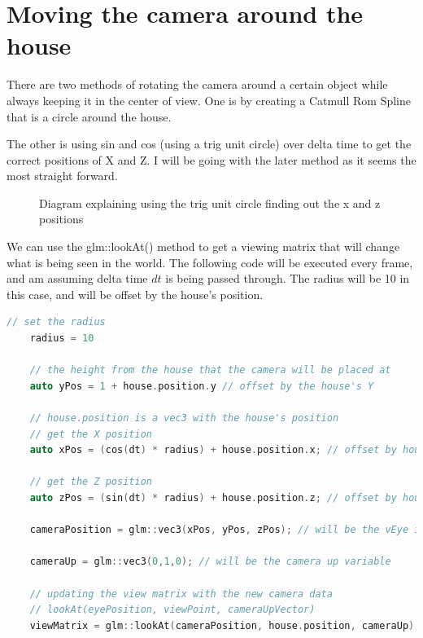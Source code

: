 \documentclass[10pt]{report}
\begin{document}
\section{Moving the camera around the house}
There are two methods of rotating the camera around a certain object while always keeping it in the center of view.
One is by creating a Catmull Rom Spline that is a circle around the house.

The other is using sin and cos (using a trig unit circle) over delta time to get the correct positions of X and Z. I will be going with the later method as it seems the most straight forward.

\begin{figure}[H]
    \centering
    \caption{Diagram explaining using the trig unit circle finding out the x and z positions}
\end{figure}


We can use the glm::lookAt() method to get a viewing matrix that will change what is being seen in the world. The following code will be executed every frame, and am assuming delta time \(dt\) is being passed through. The radius will be 10 in this case, and will be offset by the house's position.

\begin{lstlisting}[language = c]
    // set the radius
    radius = 10

    // the height from the house that the camera will be placed at
    auto yPos = 1 + house.position.y // offset by the house's Y

    // house.position is a vec3 with the house's position
    // get the X position 
    auto xPos = (cos(dt) * radius) + house.position.x; // offset by house's X

    // get the Z position
    auto zPos = (sin(dt) * radius) + house.position.z; // offset by house's Z

    cameraPosition = glm::vec3(xPos, yPos, zPos); // will be the vEye in the lookAt

    cameraUp = glm::vec3(0,1,0); // will be the camera up variable

    // updating the view matrix with the new camera data
    // lookAt(eyePosition, viewPoint, cameraUpVector)
    viewMatrix = glm::lookAt(cameraPosition, house.position, cameraUp);

\end{lstlisting}
\end{document}
